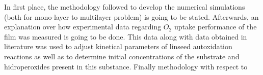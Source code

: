


In first place, the methodology followed to develop the numerical simulations (both for mono-layer to multilayer problem) is going to be stated. Afterwards, an explanation over how experimental data regarding $O_2$ uptake performance of the film was measured is going to be done. This data along with data obtained in literature was used to adjust kinetical parameters of linseed autoxidation reactions as well as to determine  initial concentrations of the substrate and hidroperoxides present in this substance. Finally methodology with respect to 


